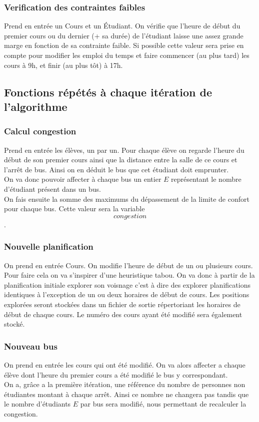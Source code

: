 \documentclass[a4paper,11pt]{article}
\begin{document}
		\subsubsection{Verification des contraintes faibles}
			Prend en entrée un Cours et un Étudiant.
			On vérifie que l'heure de début du premier cours ou du dernier (+ sa durée) de l'étudiant laisse une assez grande marge en fonction de sa contrainte faible.
			Si possible cette valeur sera prise en compte pour modifier les emploi du temps et faire commencer (au plus tard) les cours à 9h, et finir (au plus tôt) à 17h.
		\subsection{Fonctions répétés à chaque itération de l'algorithme}
			\subsubsection{Calcul congestion}
				Prend en entrée les élèves, un par un.
				Pour chaque élève on regarde l'heure du début de son premier cours ainsi que la distance entre la salle de ce cours et l'arrêt de bus. 
				Ainsi on en déduit le bus que cet étudiant doit emprunter.\\
				On va donc pouvoir affecter à chaque bus un entier $E$ représentant le nombre d'étudiant présent dans un bus.\\
				On fais ensuite la somme des maximums du dépassement de la limite de confort pour chaque bus. Cette valeur sera la variable $$congestion$$.
			\subsubsection{Nouvelle planification}
				On prend en entrée Cours.
				On modifie l'heure de début de un ou plusieurs cours. Pour faire cela on va s'inspirer d'une heuristique tabou.
				On va donc à partir de la planification initiale explorer son voisnage c'est à dire des explorer planifications identiques à l'exception
				de un ou deux horaires de début de cours.
				Les positions explorées seront stockées dans un fichier de sortie répertoriant les horaires de début de chaque cours.
				Le numéro des cours ayant été modifié sera également stocké.
			\subsubsection{Nouveau bus}
				On prend en entrée les cours qui ont été modifié.
				On va alors affecter a chaque élève dont l'heure du premier cours a été modifié le bus y correspondant.\\
				On a, grâce a la première itération, une référence du nombre de personnes non étudiantes montant à chaque arrêt. Ainsi ce nombre ne changera pas tandis que le nombre d'étudiants $E$ par bus sera modifié, nous permettant de recalculer la congestion. 
\end{document}

